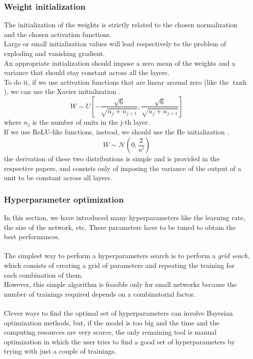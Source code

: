 \subsubsection*{Weight initialization}
The initialization of the weights is strictly related to the chosen normalization and the chosen activation functions.\\
Large or small initialization values will lead respectively to the problem of exploding and vanishing gradient.\\
An appropriate initialization should impose a zero mean of the weights and a variance that should stay constant across all the layers.
\\
To do it, if we use activation functions that are linear around zero (like the $\tanh$), we can use the Xavier initialization \cite{Glorot2010UnderstandingNetworks}.
\begin{equation}
    W\sim U \left[-\frac{\sqrt{6}}{\sqrt{n_j+n_{j+1}}},\frac{\sqrt{6}}{\sqrt{n_j+n_{j+1}}} \right]
\end{equation}
where $n_j$ is the number of units in the j-th layer.\\
If we use ReLU-like functions, instead, we should use the He initialization \cite{he2015delving}.
\begin{equation}
    W\sim \mathcal{N}\left(0,\frac{2}{n^l}\right)
\end{equation}
the derivation of these two distributions is simple and is provided in the respective papers, and consists only of imposing the variance of the output of a unit to be constant across all layers.

\subsubsection*{Hyperparameter optimization}
In this section, we have introduced many hyperparameters like the learning rate, the size of the network, etc. These parameters have to be tuned to obtain the best performances.\\
\\
The simplest way to perform a hyperparameters search is to perform a \textit{grid seach}, which consists of creating a grid of parameters and repeating the training for each combination of them.\\
However, this simple algorithm is feasible only for small networks because the number of trainings required depends on a combinatorial factor.\\
\\
Clever ways to find the optimal set of hyperparameters can involve Bayesian optimization methods, but, if the model is too big and the time and the computing resources are very scarce, the only remaining tool is manual optimization in which the user tries to find a good set of hyperparameters by trying with just a couple of trainings.



